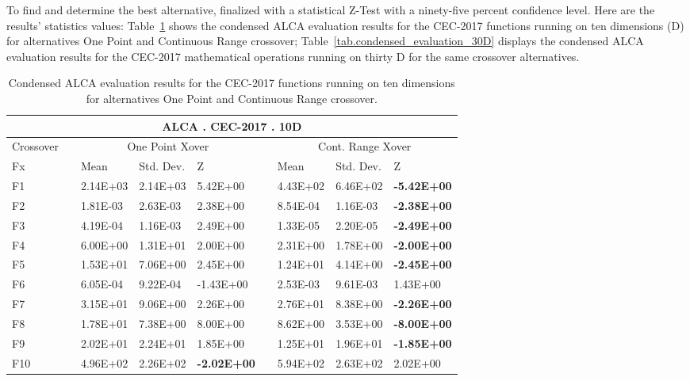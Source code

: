 \documentclass[graybox]{svmult}
\begin{document}
    To find and determine the best alternative, finalized with a statistical Z-Test with a ninety-five percent confidence level. Here are the results' statistics values: Table~\ref{tab.condensed_evaluation_10D} shows the condensed ALCA evaluation results for the CEC-2017 functions running on ten dimensions (D) for alternatives One Point and Continuous Range crossover; Table~\ref{tab.condensed_evaluation_30D} displays the condensed ALCA evaluation results for the CEC-2017 mathematical operations running on thirty D for the same crossover alternatives.

    \begin{table}[]
    \scriptsize
    \centering
    \caption{Condensed ALCA evaluation results for the CEC-2017 functions running on ten dimensions for alternatives One Point and Continuous Range crossover.}\label{tab.condensed_evaluation_10D}
    \begin{tabular}{@{}lllllllll@{}}
    \toprule
    \multicolumn{9}{c}{\textbf{ALCA . CEC-2017 . 10D}} \\ \midrule
    Crossover &  & \multicolumn{3}{c}{One Point Xover} &  & \multicolumn{3}{c}{Cont. Range Xover} \\
    Fx &  & Mean & Std. Dev. & Z &  & Mean & Std. Dev. & Z \\
    F1 &  & 2.14E+03 & 2.14E+03 & 5.42E+00 &  & 4.43E+02 & 6.46E+02 & \textbf{-5.42E+00} \\
    F2 &  & 1.81E-03 & 2.63E-03 & 2.38E+00 &  & 8.54E-04 & 1.16E-03 & \textbf{-2.38E+00} \\
    F3 &  & 4.19E-04 & 1.16E-03 & 2.49E+00 &  & 1.33E-05 & 2.20E-05 & \textbf{-2.49E+00} \\
    F4 &  & 6.00E+00 & 1.31E+01 & 2.00E+00 &  & 2.31E+00 & 1.78E+00 & \textbf{-2.00E+00} \\
    F5 &  & 1.53E+01 & 7.06E+00 & 2.45E+00 &  & 1.24E+01 & 4.14E+00 & \textbf{-2.45E+00} \\
    F6 &  & 6.05E-04 & 9.22E-04 & -1.43E+00 &  & 2.53E-03 & 9.61E-03 & 1.43E+00 \\
    F7 &  & 3.15E+01 & 9.06E+00 & 2.26E+00 &  & 2.76E+01 & 8.38E+00 & \textbf{-2.26E+00} \\
    F8 &  & 1.78E+01 & 7.38E+00 & 8.00E+00 &  & 8.62E+00 & 3.53E+00 & \textbf{-8.00E+00} \\
    F9 &  & 2.02E+01 & 2.24E+01 & 1.85E+00 &  & 1.25E+01 & 1.96E+01 & \textbf{-1.85E+00} \\
    F10 &  & 4.96E+02 & 2.26E+02 & \textbf{-2.02E+00} &  & 5.94E+02 & 2.63E+02 & 2.02E+00 \\

\end{tabular}
\end{table}
\end{document}
